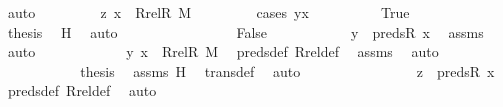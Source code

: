 \begin{isabellebody}
\ auto\ \isanewline
\ \ \ \ \ \ \isamarkupfalse%
\ {\isachardoublequoteopen}{\isacharless}{\kern0pt}z{\isacharcomma}{\kern0pt}\ x{\isachargreater}{\kern0pt}\ {\isasymin}\ Rrel{\isacharparenleft}{\kern0pt}R{\isacharcomma}{\kern0pt}\ M{\isacharparenright}{\kern0pt}{\isachardoublequoteclose}\ \isanewline
\ \ \ \ \ \ \isamarkupfalse%
\ {\isacharparenleft}{\kern0pt}cases\ {\isachardoublequoteopen}y{\isacharequal}{\kern0pt}x{\isachardoublequoteclose}{\isacharparenright}{\kern0pt}\isanewline
\ \ \ \ \ \ \ \ \isamarkupfalse%
\ True\isanewline
\ \ \ \ \ \ \ \ \isamarkupfalse%
\ \isamarkupfalse%
\ {\isacharquery}{\kern0pt}thesis\ \isamarkupfalse%
\ H\ \isamarkupfalse%
\ auto\isanewline
\ \ \ \ \ \ \isamarkupfalse%
\isanewline
\ \ \ \ \ \ \ \ \isamarkupfalse%
\ False\isanewline
\ \ \ \ \ \ \ \ \isamarkupfalse%
\ \isamarkupfalse%
\ {\isachardoublequoteopen}y\ {\isasymin}\ preds{\isacharparenleft}{\kern0pt}R{\isacharcomma}{\kern0pt}\ x{\isacharparenright}{\kern0pt}{\isachardoublequoteclose}\ \isamarkupfalse%
\ assms{}\ \isamarkupfalse%
\ auto\ \isanewline
\ \ \ \ \ \ \ \ \isamarkupfalse%
\ \isamarkupfalse%
\ {\isachardoublequoteopen}{\isacharless}{\kern0pt}y{\isacharcomma}{\kern0pt}\ x{\isachargreater}{\kern0pt}\ {\isasymin}\ Rrel{\isacharparenleft}{\kern0pt}R{\isacharcomma}{\kern0pt}\ M{\isacharparenright}{\kern0pt}{\isachardoublequoteclose}\ \isamarkupfalse%
\ preds{\isacharunderscore}{\kern0pt}def\ Rrel{\isacharunderscore}{\kern0pt}def\ \isamarkupfalse%
\ assms\ \isamarkupfalse%
\ auto\ \isanewline
\ \ \ \ \ \ \ \ \isamarkupfalse%
\ \isamarkupfalse%
\ {\isacharquery}{\kern0pt}thesis\ \isamarkupfalse%
\ assms\ H\ \isamarkupfalse%
\ trans{\isacharunderscore}{\kern0pt}def\ \isamarkupfalse%
\ auto\isanewline
\ \ \ \ \ \ \isamarkupfalse%
\isanewline
\ \ \ \ \ \ \isamarkupfalse%
\ \isamarkupfalse%
\ {\isachardoublequoteopen}z\ {\isasymin}\ preds{\isacharparenleft}{\kern0pt}R{\isacharcomma}{\kern0pt}\ x{\isacharparenright}{\kern0pt}{\isachardoublequoteclose}\ \isamarkupfalse%
\ preds{\isacharunderscore}{\kern0pt}def\ Rrel{\isacharunderscore}{\kern0pt}def\ \isamarkupfalse%
\ auto\ \isanewline

\end{isabellebody}
